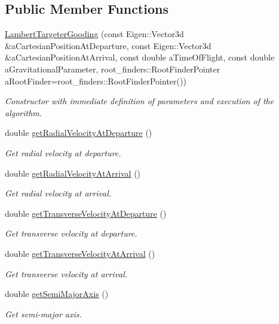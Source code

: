 \subsection*{Public Member Functions}
\begin{DoxyCompactItemize}
\item 
\hyperlink{classtudat_1_1mission__segments_1_1LambertTargeterGooding_acb5db095620081363af56fdabc1d7ecd}{Lambert\+Targeter\+Gooding} (const Eigen\+::\+Vector3d \&a\+Cartesian\+Position\+At\+Departure, const Eigen\+::\+Vector3d \&a\+Cartesian\+Position\+At\+Arrival, const double a\+Time\+Of\+Flight, const double a\+Gravitational\+Parameter, root\+\_\+finders\+::\+Root\+Finder\+Pointer a\+Root\+Finder=root\+\_\+finders\+::\+Root\+Finder\+Pointer())
\begin{DoxyCompactList}\small\item\em Constructor with immediate definition of parameters and execution of the algorithm. \end{DoxyCompactList}\item 
double \hyperlink{classtudat_1_1mission__segments_1_1LambertTargeterGooding_a5aaa67242a073186793fe51cf76c18d7}{get\+Radial\+Velocity\+At\+Departure} ()
\begin{DoxyCompactList}\small\item\em Get radial velocity at departure. \end{DoxyCompactList}\item 
double \hyperlink{classtudat_1_1mission__segments_1_1LambertTargeterGooding_ac1cfec31d01487e5094c13dede87de00}{get\+Radial\+Velocity\+At\+Arrival} ()
\begin{DoxyCompactList}\small\item\em Get radial velocity at arrival. \end{DoxyCompactList}\item 
double \hyperlink{classtudat_1_1mission__segments_1_1LambertTargeterGooding_adcff4746bb258f78195cee3eb03e3bf8}{get\+Transverse\+Velocity\+At\+Departure} ()
\begin{DoxyCompactList}\small\item\em Get transverse velocity at departure. \end{DoxyCompactList}\item 
double \hyperlink{classtudat_1_1mission__segments_1_1LambertTargeterGooding_a03ead3601fead16cc6fcbc7c6ed0914d}{get\+Transverse\+Velocity\+At\+Arrival} ()
\begin{DoxyCompactList}\small\item\em Get transverse velocity at arrival. \end{DoxyCompactList}\item 
double \hyperlink{classtudat_1_1mission__segments_1_1LambertTargeterGooding_a4093726973d7154f32538cbd6455d00e}{get\+Semi\+Major\+Axis} ()
\begin{DoxyCompactList}\small\item\em Get semi-\/major axis. \end{DoxyCompactList}\end{DoxyCompactItemize}
